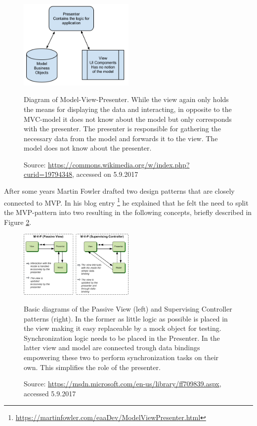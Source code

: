 \begin{figure}[htbp]
	\centering

	\includegraphics[width=0.5\textwidth]{./content/pictures/mvp.png}
	\caption{Diagram of Model-View-Presenter. While the view again only holds the means for displaying the data and interacting, in opposite to the MVC-model it does not know about the model but only corresponds with the presenter. The presenter is responsible for gathering the necessary data from the model and forwards it to the view. The model does not know about the presenter.}
	\label{fig:mvp}
	\caption*{Source: \href{https://commons.wikimedia.org/w/index.php?curid=19794348}{https://commons.wikimedia.org/w/index.php?curid=19794348}, accessed on 5.9.2017}
\end{figure}


After some years Martin Fowler drafted two design patterns that are closely connected to MVP. In his blog entry \footnote{\href{https://martinfowler.com/eaaDev/ModelViewPresenter.html}{https://martinfowler.com/eaaDev/ModelViewPresenter.html}} he explained that he felt the need to split the MVP-pattern into two resulting in the following concepts, briefly described in Figure \ref{fig:passive-view-supervision-controller}. 

\begin{figure}[htbp]
	\centering

	\includegraphics[width=0.5\textwidth]{./content/pictures/passive-view.png}
	\caption{Basic diagrams of the Passive View (left) and Supervising Controller patterns (right). In the former as little logic as possible is placed in the view making it easy replaceable by a mock object for testing. Synchronization logic needs to be placed in the Presenter. In the latter view and model are connected trough data bindings empowering these two to perform synchronization tasks on their own. This simplifies the role of the presenter.}
	\label{fig:passive-view-supervision-controller}
	\caption*{Source: \href{https://msdn.microsoft.com/en-us/library/ff709839.aspx}{https://msdn.microsoft.com/en-us/library/ff709839.aspx}, accessed 5.9.2017}
\end{figure}

